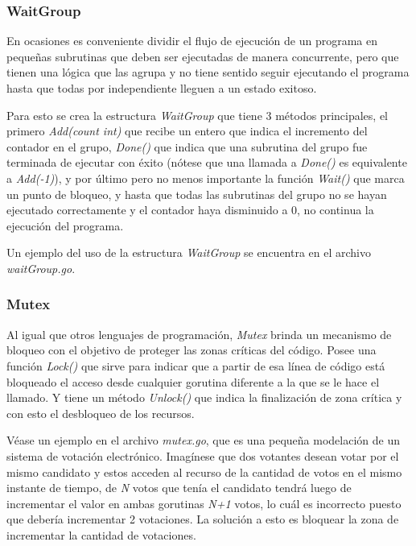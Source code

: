 \documentclass[10pt]{article} %
\begin{document}
\subsubsection{WaitGroup}

En ocasiones es conveniente dividir el flujo de ejecución de un programa en pequeñas subrutinas que deben ser ejecutadas de manera concurrente, pero que tienen una lógica que las agrupa y no tiene sentido seguir ejecutando el programa hasta que todas por independiente lleguen a un estado exitoso.

Para esto se crea la estructura \emph{WaitGroup} que tiene 3 métodos principales, el primero \emph{Add(count int)} que recibe un entero que indica el incremento del contador en el grupo, \emph{Done()} que indica que una subrutina del grupo fue terminada de ejecutar con éxito (nótese que una llamada a \emph{Done()} es equivalente a \emph{Add(-1)}), y por último pero no menos importante la función \emph{Wait()} que marca un punto de bloqueo, y hasta que todas las subrutinas del grupo no se hayan ejecutado correctamente y el contador haya disminuido a 0, no continua la ejecución del programa.

Un ejemplo del uso de la estructura \emph{WaitGroup} se encuentra en el archivo \textit{waitGroup.go}. 

\subsubsection{Mutex}

Al igual que otros lenguajes de programación, \emph{Mutex} brinda un mecanismo de bloqueo con el objetivo de proteger las zonas críticas del código. Posee una función \emph{Lock()} que sirve para indicar que a partir de esa línea de código está bloqueado el acceso desde cualquier gorutina diferente a la que se le hace el llamado. Y tiene un método \emph{Unlock()} que indica la finalización de zona crítica y con esto el desbloqueo de los recursos.

Véase un ejemplo en el archivo \textit{mutex.go}, que es una pequeña modelación de un sistema de votación electrónico. Imagínese que dos votantes desean votar por el mismo candidato y estos acceden al recurso de la cantidad de votos en el mismo instante de tiempo, de \textit{N} votos que tenía el candidato tendrá luego de incrementar el valor en ambas gorutinas \textit{N+1} votos, lo cuál es incorrecto puesto que debería incrementar 2 votaciones. La solución a esto es bloquear la zona de incrementar la cantidad de votaciones. 
\end{document}
